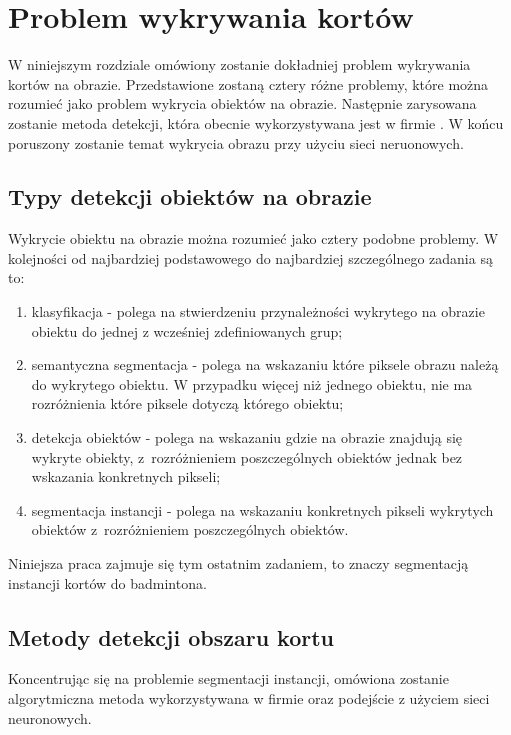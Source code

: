 \chapter{Problem wykrywania kortów}

W niniejszym rozdziale omówiony zostanie dokładniej problem wykrywania kortów na obrazie.
Przedstawione zostaną cztery różne problemy, które można rozumieć jako problem wykrycia obiektów na obrazie.
Następnie zarysowana zostanie metoda detekcji, która obecnie wykorzystywana jest w firmie \blue.
W końcu poruszony zostanie temat wykrycia obrazu przy użyciu sieci neruonowych.

\section{Typy detekcji obiektów na obrazie}
\label{sec:typy_detekcji}

Wykrycie obiektu na obrazie można rozumieć jako cztery podobne problemy.
W kolejności od najbardziej podstawowego do najbardziej szczególnego zadania są to:

\begin{enumerate}
	\item klasyfikacja - polega na stwierdzeniu przynależności wykrytego na obrazie obiektu do jednej z wcześniej zdefiniowanych grup;
  \item semantyczna segmentacja - polega na wskazaniu które piksele obrazu należą do wykrytego obiektu.
        W przypadku więcej niż jednego obiektu, nie ma rozróżnienia które piksele dotyczą którego obiektu;
	\item detekcja obiektów - polega na wskazaniu gdzie na obrazie znajdują się wykryte obiekty, z~rozróżnieniem poszczególnych obiektów jednak bez wskazania konkretnych pikseli;
	\item segmentacja instancji - polega na wskazaniu konkretnych pikseli wykrytych obiektów z~rozróżnieniem poszczególnych obiektów.
\end{enumerate}

Niniejsza praca zajmuje się tym ostatnim zadaniem, to znaczy segmentacją instancji kortów do badmintona.

\section{Metody detekcji obszaru kortu}
\label{sec:metody_detekcji}

Koncentrując się na problemie segmentacji instancji, omówiona zostanie algorytmiczna metoda wykorzystywana w firmie \blue oraz podejście z użyciem sieci neuronowych. \\

